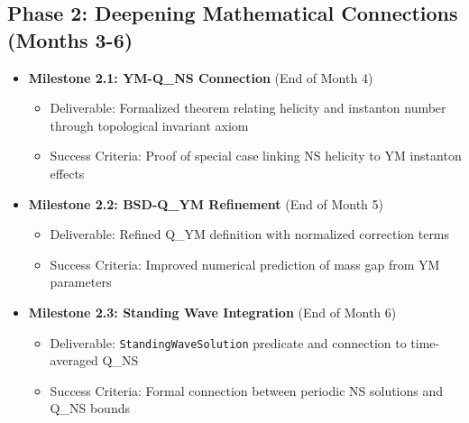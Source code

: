 \documentclass[11pt]{article}
\begin{document}
\subsection{Phase 2: Deepening Mathematical Connections (Months 3-6)}
\begin{itemize}
\item \textbf{Milestone 2.1: YM-Q\_NS Connection} (End of Month 4)
  \begin{itemize}
  \item Deliverable: Formalized theorem relating helicity and instanton number through topological invariant axiom
  \item Success Criteria: Proof of special case linking NS helicity to YM instanton effects
  \end{itemize}
\item \textbf{Milestone 2.2: BSD-Q\_YM Refinement} (End of Month 5)
  \begin{itemize}
  \item Deliverable: Refined Q\_YM definition with normalized correction terms
  \item Success Criteria: Improved numerical prediction of mass gap from YM parameters
  \end{itemize}
\item \textbf{Milestone 2.3: Standing Wave Integration} (End of Month 6)
  \begin{itemize}
  \item Deliverable: \texttt{StandingWaveSolution} predicate and connection to time-averaged Q\_NS
  \item Success Criteria: Formal connection between periodic NS solutions and Q\_NS bounds
  \end{itemize}
\end{itemize}
\end{document}
